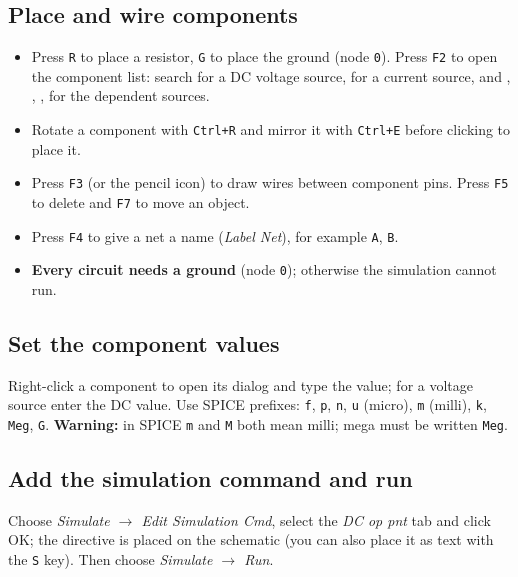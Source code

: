 \subsection{Place and wire components}
\begin{itemize}
  \item Press \texttt{R} to place a resistor, \texttt{G} to place the ground (node \texttt{0}). Press \texttt{F2} to open the component list: search  for a DC voltage source,  for a current source, and , , ,  for the dependent sources.
  \item Rotate a component with \texttt{Ctrl+R} and mirror it with \texttt{Ctrl+E} before clicking to place it.
  \item Press \texttt{F3} (or the pencil icon) to draw wires between component pins. Press \texttt{F5} to delete and \texttt{F7} to move an object.
  \item Press \texttt{F4} to give a net a name (\textit{Label Net}), for example \texttt{A}, \texttt{B}.
  \item \textbf{Every circuit needs a ground} (node \texttt{0}); otherwise the simulation cannot run.
\end{itemize}

\subsection{Set the component values}
Right-click a component to open its dialog and type the value; for a voltage source enter the DC value. Use SPICE prefixes: \texttt{f}, \texttt{p}, \texttt{n}, \texttt{u} (micro), \texttt{m} (milli), \texttt{k}, \texttt{Meg}, \texttt{G}. \textbf{Warning:} in SPICE \texttt{m} and \texttt{M} both mean milli; mega must be written \texttt{Meg}.

\subsection{Add the simulation command and run}
Choose \textit{Simulate $\rightarrow$ Edit Simulation Cmd}, select the \textit{DC op pnt} tab and click OK; the directive  is placed on the schematic (you can also place it as text with the \texttt{S} key). Then choose \textit{Simulate $\rightarrow$ Run}.

